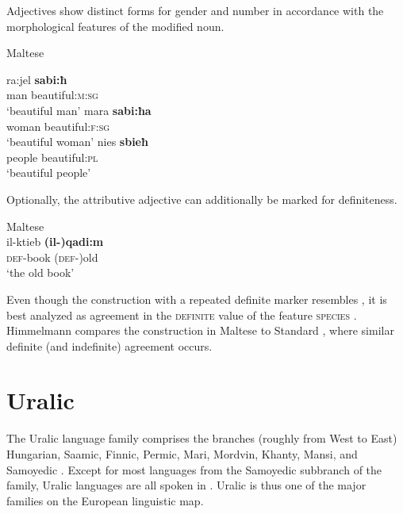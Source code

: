 Adjectives show distinct forms for gender and number in accordance with the morphological features of the modified noun.
\begin{exe}
\ex \rm{Maltese \citep[328]{aquilina1959}}
\begin{xlist}
\ex
\gll	ra:jel \textbf{sabi:ħ}\\
	man beautiful:\textsc{m:sg}\\
\glt	‘beautiful man’
\ex
\gll	mara \textbf{sabi:ħa}\\
	woman beautiful:\textsc{f:sg}\\
\glt	‘beautiful woman’
\ex
\gll	nies \textbf{sbieħ}\\
	people beautiful:\textsc{pl}\\
\glt	‘beautiful people’
\end{xlist}
\end{exe}
Optionally, the attributive adjective can additionally be marked for definiteness.
\begin{exe}
\ex \rm{Maltese \citep[330]{aquilina1959}}\\
\gll	il-ktieb \textbf{(il-)qadi:m}\\
	\textsc{def}-book	(\textsc{def-})old\\
\glt	‘the old book’
\end{exe}
Even though the construction with a repeated definite marker resembles , it is best analyzed as agreement in the \textsc{definite} value of the feature \textsc{species} \citep[179]{himmelmann1997}. Himmelmann compares the construction in Maltese to Standard , where similar definite (and indefinite) agreement occurs.
				
\section{Uralic}\label{uralic synchr}
The Uralic language family comprises the branches (roughly from West to East) Hungarian, Saamic, Finnic, Permic, Mari, Mordvin, Khanty, Mansi, and Samoyedic \citep[216–218]{salminen2007}. Except for most languages from the Samoyedic subbranch of the family, Uralic languages are all spoken in . Uralic is thus one of the major families on the European linguistic map.


